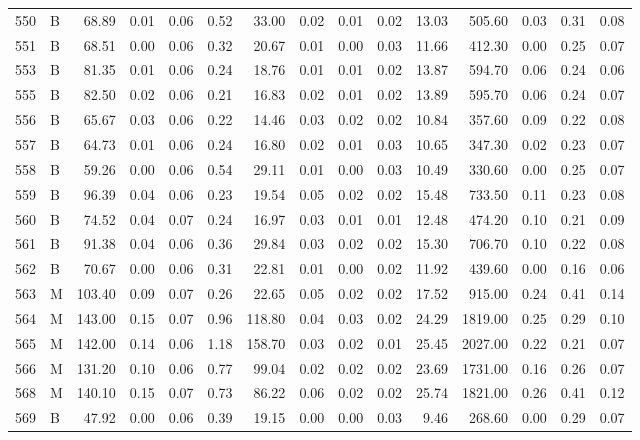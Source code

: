 \begin{table}[ht]
\begin{tabular}{rlrrrrrrrrrrrrr}
  550 & B & 68.89 & 0.01 & 0.06 & 0.52 & 33.00 & 0.02 & 0.01 & 0.02 & 13.03 & 505.60 & 0.03 & 0.31 & 0.08 \\ 
  551 & B & 68.51 & 0.00 & 0.06 & 0.32 & 20.67 & 0.01 & 0.00 & 0.03 & 11.66 & 412.30 & 0.00 & 0.25 & 0.07 \\ 
  553 & B & 81.35 & 0.01 & 0.06 & 0.24 & 18.76 & 0.01 & 0.01 & 0.02 & 13.87 & 594.70 & 0.06 & 0.24 & 0.06 \\ 
  555 & B & 82.50 & 0.02 & 0.06 & 0.21 & 16.83 & 0.02 & 0.01 & 0.02 & 13.89 & 595.70 & 0.06 & 0.24 & 0.07 \\ 
  556 & B & 65.67 & 0.03 & 0.06 & 0.22 & 14.46 & 0.03 & 0.02 & 0.02 & 10.84 & 357.60 & 0.09 & 0.22 & 0.08 \\ 
  557 & B & 64.73 & 0.01 & 0.06 & 0.24 & 16.80 & 0.02 & 0.01 & 0.03 & 10.65 & 347.30 & 0.02 & 0.23 & 0.07 \\ 
  558 & B & 59.26 & 0.00 & 0.06 & 0.54 & 29.11 & 0.01 & 0.00 & 0.03 & 10.49 & 330.60 & 0.00 & 0.25 & 0.07 \\ 
  559 & B & 96.39 & 0.04 & 0.06 & 0.23 & 19.54 & 0.05 & 0.02 & 0.02 & 15.48 & 733.50 & 0.11 & 0.23 & 0.08 \\ 
  560 & B & 74.52 & 0.04 & 0.07 & 0.24 & 16.97 & 0.03 & 0.01 & 0.01 & 12.48 & 474.20 & 0.10 & 0.21 & 0.09 \\ 
  561 & B & 91.38 & 0.04 & 0.06 & 0.36 & 29.84 & 0.03 & 0.02 & 0.02 & 15.30 & 706.70 & 0.10 & 0.22 & 0.08 \\ 
  562 & B & 70.67 & 0.00 & 0.06 & 0.31 & 22.81 & 0.01 & 0.00 & 0.02 & 11.92 & 439.60 & 0.00 & 0.16 & 0.06 \\ 
  563 & M & 103.40 & 0.09 & 0.07 & 0.26 & 22.65 & 0.05 & 0.02 & 0.02 & 17.52 & 915.00 & 0.24 & 0.41 & 0.14 \\ 
  564 & M & 143.00 & 0.15 & 0.07 & 0.96 & 118.80 & 0.04 & 0.03 & 0.02 & 24.29 & 1819.00 & 0.25 & 0.29 & 0.10 \\ 
  565 & M & 142.00 & 0.14 & 0.06 & 1.18 & 158.70 & 0.03 & 0.02 & 0.01 & 25.45 & 2027.00 & 0.22 & 0.21 & 0.07 \\ 
  566 & M & 131.20 & 0.10 & 0.06 & 0.77 & 99.04 & 0.02 & 0.02 & 0.02 & 23.69 & 1731.00 & 0.16 & 0.26 & 0.07 \\ 
  568 & M & 140.10 & 0.15 & 0.07 & 0.73 & 86.22 & 0.06 & 0.02 & 0.02 & 25.74 & 1821.00 & 0.26 & 0.41 & 0.12 \\ 
  569 & B & 47.92 & 0.00 & 0.06 & 0.39 & 19.15 & 0.00 & 0.00 & 0.03 & 9.46 & 268.60 & 0.00 & 0.29 & 0.07 \\ 
   \hline
\end{tabular}
\end{table}

